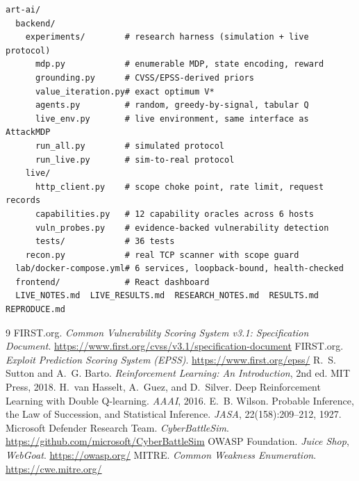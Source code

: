 \documentclass[11pt,a4paper]{report}
\begin{document}
\begin{lstlisting}
art-ai/
  backend/
    experiments/        # research harness (simulation + live protocol)
      mdp.py            # enumerable MDP, state encoding, reward
      grounding.py      # CVSS/EPSS-derived priors
      value_iteration.py# exact optimum V*
      agents.py         # random, greedy-by-signal, tabular Q
      live_env.py       # live environment, same interface as AttackMDP
      run_all.py        # simulated protocol
      run_live.py       # sim-to-real protocol
    live/
      http_client.py    # scope choke point, rate limit, request records
      capabilities.py   # 12 capability oracles across 6 hosts
      vuln_probes.py    # evidence-backed vulnerability detection
      tests/            # 36 tests
    recon.py            # real TCP scanner with scope guard
  lab/docker-compose.yml# 6 services, loopback-bound, health-checked
  frontend/             # React dashboard
  LIVE_NOTES.md  LIVE_RESULTS.md  RESEARCH_NOTES.md  RESULTS.md  REPRODUCE.md
\end{lstlisting}

\begin{thebibliography}{9}
 FIRST.org. \emph{Common Vulnerability Scoring System v3.1:
Specification Document}. \url{https://www.first.org/cvss/v3.1/specification-document}
 FIRST.org. \emph{Exploit Prediction Scoring System (EPSS)}.
\url{https://www.first.org/epss/}
 R.~S. Sutton and A.~G. Barto. \emph{Reinforcement Learning: An
Introduction}, 2nd ed. MIT Press, 2018.
 H.~van Hasselt, A.~Guez, and D.~Silver. Deep Reinforcement
Learning with Double Q-learning. \emph{AAAI}, 2016.
 E.~B. Wilson. Probable Inference, the Law of Succession, and
Statistical Inference. \emph{JASA}, 22(158):209--212, 1927.
 Microsoft Defender Research Team.
\emph{CyberBattleSim}. \url{https://github.com/microsoft/CyberBattleSim}
 OWASP Foundation. \emph{Juice Shop}, \emph{WebGoat}.
\url{https://owasp.org/}
 MITRE. \emph{Common Weakness Enumeration}. \url{https://cwe.mitre.org/}
\end{thebibliography}
\end{document}
